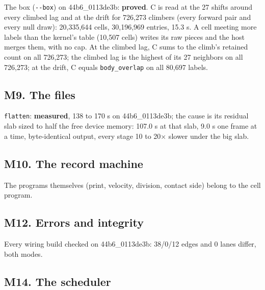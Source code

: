 The box (\texttt{-\allowbreak{}-\allowbreak{}box}) on 44b6\_\allowbreak{}0113de3b: \textbf{proved}. C is read at the 27 shifts around every climbed lag and at the drift for 726,273 climbers (every forward pair and every null draw): 20,335,644 cells, 30,196,969 entries, 15.3 s. A cell meeting more labels than the kernel's table (10,507 cells) writes its raw pieces and the host merges them, with no cap. At the climbed lag, C sums to the climb's retained count on all 726,273; the climbed lag is the highest of its 27 neighbors on all 726,273; at the drift, C equals \texttt{body\_\allowbreak{}overlap} on all 80,697 labels.

\subsection{\texorpdfstring{M9. The files}{M9. The files}}

\texttt{flatten}: \textbf{measured}, 138 to 170 s on 44b6\_\allowbreak{}0113de3b; the cause is its residual slab sized to half the free device memory: 107.0 s at that slab, 9.0 s one frame at a time, byte-identical output, every stage 10 to 20× slower under the big slab.

\subsection{\texorpdfstring{M10. The record machine}{M10. The record machine}}

The programs themselves (print, velocity, division, contact side) belong to the cell program.

\subsection{\texorpdfstring{M12. Errors and integrity}{M12. Errors and integrity}}

Every wiring build checked on 44b6\_\allowbreak{}0113de3b: 38/0/12 edges and 0 lanes differ, both modes.

\subsection{\texorpdfstring{M14. The scheduler}{M14. The scheduler}}

